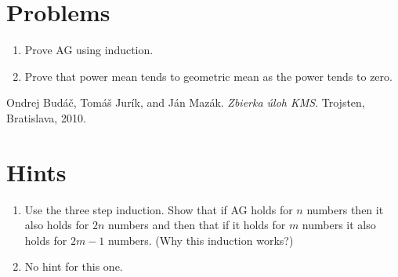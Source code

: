 \documentclass[11pt,a5paper]{article}
\begin{document}
\section{Problems}

\begin{enumerate}
	\subsection*{Easy}

	\subsection*{Medium}
	
	\subsection*{Difficult}

	\subsection*{Extra}	
	\item{Prove AG using induction.}
	
	\item{Prove that power mean tends to geometric mean as the power 
	tends to zero.}
\end{enumerate}

\begin{thebibliography}{9}
 Ondrej Budáč, Tomáš Jurík, and Ján Mazák. 
	\emph{Zbierka úloh KMS}. Trojsten, Bratislava, 2010.

\end{thebibliography}

\section{Hints}
\begin{enumerate}
	\subsection*{Easy}

	\subsection*{Medium}
	
	\subsection*{Difficult}

	\subsection*{Extra}	
	\item{Use the three step induction. Show that if AG holds for $n$ 
	numbers then it also holds for $2n$ numbers and then that if it 
	holds for $m$ numbers it also holds for $2m-1$ numbers. (Why this 
	induction works?)}
	
	\item{No hint for this one.}
\end{enumerate}
\end{document}
